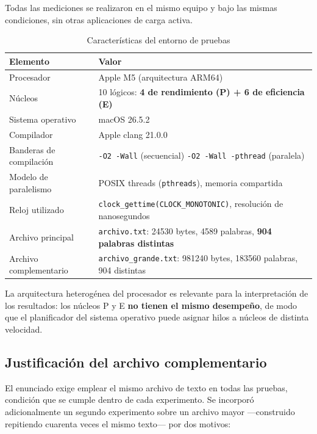\documentclass[11pt,letterpaper]{article}
\begin{document}
Todas las mediciones se realizaron en el mismo equipo y bajo las mismas
condiciones, sin otras aplicaciones de carga activa.

\begin{table}[H]
\centering
\caption{Características del entorno de pruebas}
\small
\begin{tabular}{@{}p{5.1cm}p{9.2cm}@{}}
\toprule
\textbf{Elemento} & \textbf{Valor} \\
\midrule
Procesador & Apple M5 (arquitectura ARM64) \\
Núcleos & 10 lógicos: \textbf{4 de rendimiento (P) + 6 de eficiencia (E)} \\
Sistema operativo & macOS 26.5.2 \\
Compilador & Apple clang 21.0.0 \\
Banderas de compilación & \texttt{-O2 -Wall} (secuencial)\newline
                          \texttt{-O2 -Wall -pthread} (paralela) \\
Modelo de paralelismo & POSIX threads (\texttt{pthreads}), memoria compartida \\
Reloj utilizado & \texttt{clock\_gettime(CLOCK\_MONOTONIC)}, resolución de
                  nanosegundos \\
\midrule
Archivo principal & \texttt{archivo.txt}: \num{24530} bytes, \num{4589}
                    palabras, \textbf{904 palabras distintas} \\
Archivo complementario & \texttt{archivo\_grande.txt}: \num{981240} bytes,
                         \num{183560} palabras, 904 distintas \\
\bottomrule
\end{tabular}
\end{table}

\noindent
La arquitectura heterogénea del procesador es relevante para la interpretación de
los resultados: los núcleos P y E \textbf{no tienen el mismo desempeño}, de modo
que el planificador del sistema operativo puede asignar hilos a núcleos de
distinta velocidad.

\subsection{Justificación del archivo complementario}

El enunciado exige emplear el mismo archivo de texto en todas las pruebas,
condición que se cumple dentro de cada experimento. Se incorporó adicionalmente un
segundo experimento sobre un archivo mayor —construido repitiendo cuarenta veces
el mismo texto— por dos motivos:
\end{document}
